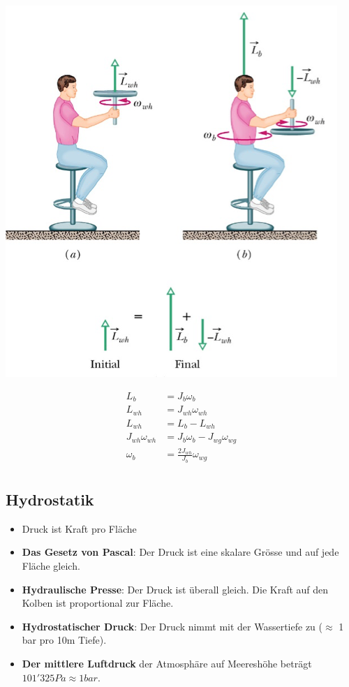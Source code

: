 \documentclass[
a4paper,
oneside,
landscape, 
8pt,
]{scrartcl}
\begin{document}
\begin{multicols*}{2}
\begin{minipage}[h!]{0.5\linewidth}
\includegraphics[width=0.8\linewidth]{images/drehimpuls}
\end{minipage}
\hfill
\begin{minipage}[h!]{0.5\linewidth}
	\begin{align*}
		L_b &= J_b \omega_b \\
		L_{wh} &= J_{wh} \omega_{wh} \\
		L_{wh} &= L_b - L_{wh} \\
		J_{wh} \omega_{wh} &= J_b \omega_b - J_{wg} \omega_{wg} \\
		\omega_b &= \frac{2J_{wh}}{J_b} \omega_{wg} \\
	\end{align*}
\end{minipage}


\clearpage


\subsection{Hydrostatik}
\begin{itemize}
	\item Druck ist Kraft pro Fläche
	\item \textbf{Das Gesetz von Pascal}: Der Druck ist eine skalare Grösse und auf jede Fläche gleich.
	\item \textbf{Hydraulische Presse}: Der Druck ist überall gleich. Die Kraft auf den Kolben ist proportional zur Fläche.
	\item \textbf{Hydrostatischer Druck}: Der Druck nimmt mit der Wassertiefe zu ($\approx$ 1 bar pro 10m Tiefe). 
	\item \textbf{Der mittlere Luftdruck} der Atmosphäre auf Meereshöhe beträgt $101'325 Pa \approx 1 bar.$	
\end{itemize}


\end{multicols*}
\end{document}
